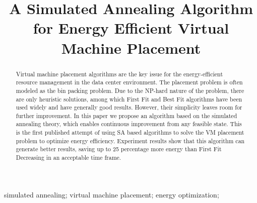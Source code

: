 \documentclass[10pt, conference, compsocconf]{IEEEtran}
\begin{document}
\setcounter{page}{1}
\pagestyle{plain}

\title{A Simulated Annealing Algorithm for Energy Efficient Virtual Machine Placement}



\author{ 
}


\maketitle


\begin{abstract}
Virtual machine placement algorithms are the key issue for the energy-efficient
resource management in the data center environment. The placement problem is
often modeled as the bin packing problem. Due to the NP-hard nature of the
problem, there are only heuristic solutions, among which First Fit and Best Fit
algorithms have been used widely and have generally good results. However, their
simplicity leaves room for further improvement. In this paper we propose an
algorithm based on the simulated annealing theory, which enables continuous
improvement from any feasible state. This is the first published
attempt of using SA based algorithms to solve the VM placement problem to optimize
energy efficiency. Experiment results show that this
algorithm can generate better results, saving up to 25 percentage more energy
than First Fit Decreasing in an acceptable time frame.

\end{abstract}

\begin{IEEEkeywords}
simulated annealing; virtual machine placement; energy optimization;

\end{IEEEkeywords}
\end{document}
